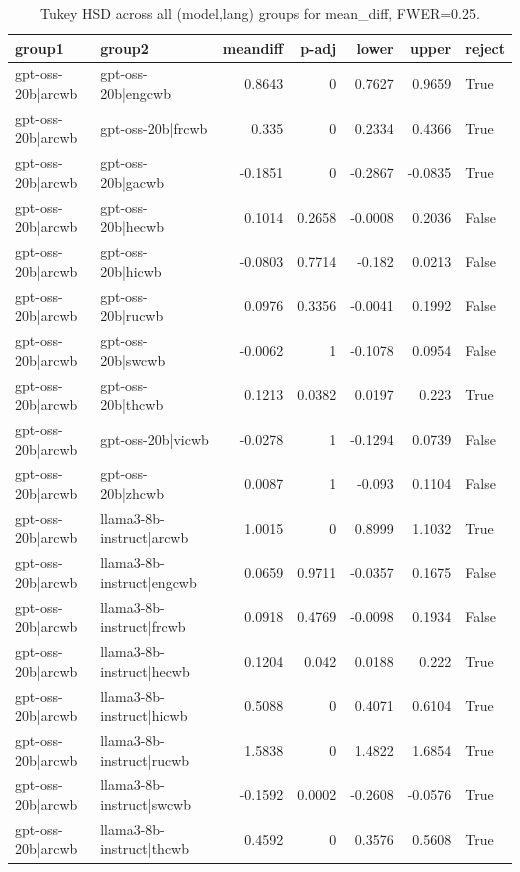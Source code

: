 \begin{table}
\caption{Tukey HSD across all (model,lang) groups for mean_diff, FWER=0.25.}
\label{tab:tukey_all_models_all_langs_mean_diff}
\begin{tabular}{l l r r r r l}
\toprule
group1 & group2 & meandiff & p-adj & lower & upper & reject \\
\midrule
gpt-oss-20b|arcwb & gpt-oss-20b|engcwb & 0.8643 & 0 & 0.7627 & 0.9659 & True \\
gpt-oss-20b|arcwb & gpt-oss-20b|frcwb & 0.335 & 0 & 0.2334 & 0.4366 & True \\
gpt-oss-20b|arcwb & gpt-oss-20b|gacwb & -0.1851 & 0 & -0.2867 & -0.0835 & True \\
gpt-oss-20b|arcwb & gpt-oss-20b|hecwb & 0.1014 & 0.2658 & -0.0008 & 0.2036 & False \\
gpt-oss-20b|arcwb & gpt-oss-20b|hicwb & -0.0803 & 0.7714 & -0.182 & 0.0213 & False \\
gpt-oss-20b|arcwb & gpt-oss-20b|rucwb & 0.0976 & 0.3356 & -0.0041 & 0.1992 & False \\
gpt-oss-20b|arcwb & gpt-oss-20b|swcwb & -0.0062 & 1 & -0.1078 & 0.0954 & False \\
gpt-oss-20b|arcwb & gpt-oss-20b|thcwb & 0.1213 & 0.0382 & 0.0197 & 0.223 & True \\
gpt-oss-20b|arcwb & gpt-oss-20b|vicwb & -0.0278 & 1 & -0.1294 & 0.0739 & False \\
gpt-oss-20b|arcwb & gpt-oss-20b|zhcwb & 0.0087 & 1 & -0.093 & 0.1104 & False \\
gpt-oss-20b|arcwb & llama3-8b-instruct|arcwb & 1.0015 & 0 & 0.8999 & 1.1032 & True \\
gpt-oss-20b|arcwb & llama3-8b-instruct|engcwb & 0.0659 & 0.9711 & -0.0357 & 0.1675 & False \\
gpt-oss-20b|arcwb & llama3-8b-instruct|frcwb & 0.0918 & 0.4769 & -0.0098 & 0.1934 & False \\
gpt-oss-20b|arcwb & llama3-8b-instruct|hecwb & 0.1204 & 0.042 & 0.0188 & 0.222 & True \\
gpt-oss-20b|arcwb & llama3-8b-instruct|hicwb & 0.5088 & 0 & 0.4071 & 0.6104 & True \\
gpt-oss-20b|arcwb & llama3-8b-instruct|rucwb & 1.5838 & 0 & 1.4822 & 1.6854 & True \\
gpt-oss-20b|arcwb & llama3-8b-instruct|swcwb & -0.1592 & 0.0002 & -0.2608 & -0.0576 & True \\
gpt-oss-20b|arcwb & llama3-8b-instruct|thcwb & 0.4592 & 0 & 0.3576 & 0.5608 & True \\

\end{tabular}
\end{table}
